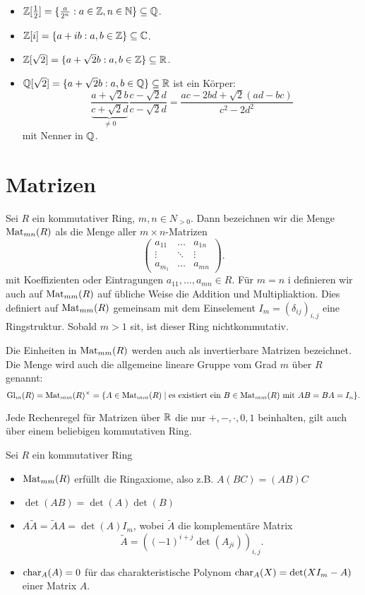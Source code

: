 \begin{eg}
	\begin{itemize}
		\item $\mathbb{Z}[\frac{1}{2}] = \{\frac{a}{2^{n}} : a \in \mathbb{Z}, n \in \mathbb{N}\} \subseteq \mathbb{Q}$.
		\item $\mathbb{Z}[i] = \{a+ib : a,b \in \mathbb{Z}\} \subseteq \mathbb{C}$. 
		\item $\mathbb{Z}[\sqrt{2}] = \{a + \sqrt{2} b: a,b \in \mathbb{Z}\} \subseteq \mathbb{R}$.
		\item $\mathbb{Q}[\sqrt{2}] = \{a+\sqrt{2} b: a,b \in \mathbb{Q}\} \subseteq \mathbb{R}$
			ist ein Körper:
			\[
			\frac{a + \sqrt{2} b}{\underbrace{c + \sqrt{2} d}_{\neq 0}} \frac{c- \sqrt{2} d}{c - \sqrt{2} d}
			= \frac{ac - 2bd + \sqrt{2} (ad-bc)}{c^2 - 2 d^2}
			\] 
			mit Nenner in $\mathbb{Q}$.
	\end{itemize}
\end{eg}

\section{Matrizen}
Sei $R$ ein kommutativer Ring, $m,n \in N_{> 0}$.
Dann bezeichnen wir die Menge $\operatorname{Mat}_{mn}(R)$ als die Menge aller $m \times n$-Matrizen
\[
\begin{pmatrix} 
a_{11} &\ldots &a_{1n}\\
\vdots &\ddots &\vdots\\
a_{m_1} &\ldots &a_{mn}
\end{pmatrix} 
.\] 
mit Koeffizienten oder Eintragungen $a_{11},\ldots,a_{mn} \in R$.
Für $m=n$ i definieren wir auch auf $\operatorname{Mat}_{mm}(R)$ auf übliche Weise die Addition und Multipliaktion.
Dies definiert auf $\operatorname{Mat}_{mm}(R)$ gemeinsam mit dem Einselement $I_{m} = (\delta_{ij})_{i,j}$ eine Ringstruktur.
Sobald $m > 1$ sit, ist dieser Ring nichtkommutativ.

Die Einheiten in $\operatorname{Mat}_{mm}(R)$ werden auch als invertierbare Matrizen bezeichnet.
Die Menge wird auch die allgemeine lineare Gruppe vom Grad $m$ über $R$ genannt:
\[
	\operatorname{Gl}_{m}(R) = \operatorname{Mat}_{mm}(R)^{\times} = \{A \in \operatorname{Mat}_{mm}(R) \mid \text{es existiert ein } B \in \operatorname{Mat}_{mm}(R) \text{ mit } AB = BA = I_{n}\}   
.\] 


\begin{proposition}[Meta]
	Jede Rechenregel für Matrizen über $\mathbb{R}$ die nur $+,-,\cdot,0,1$ beinhalten, gilt auch über einem beliebigen kommutativen Ring.
\end{proposition}

\begin{proposition}
	Sei $R$ ein kommutativer Ring
	\begin{itemize}
		\item $\operatorname{Mat}_{mm}(R)$ erfüllt die Ringaxiome, also z.B. $A(BC) = (AB)C$
		\item $\det(AB) = \det(A) \det(B)$
		\item  $A \widetilde{A} = \widetilde{A} A = \det(A) I_{m}$, wobei $\widetilde{A}$ die komplementäre Matrix
			\[
				\widetilde{A} = ((-1)^{i+j} \det(A_{ji}))_{i,j}
			.\] 
		\item $\operatorname{char}_{A}(A) = 0$ für das charakteristische Polynom $\operatorname{char}_{A}(X) = \det(X I_{m} - A)$ einer Matrix $A$.
	\end{itemize}
\end{proposition}

